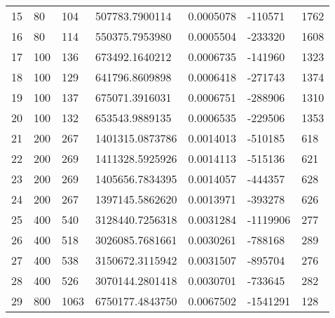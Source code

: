 \begin{longtable}{lllllll}
    15               & 80             & 104            & 507783.7900114     & 0.0005078        & -110571         & 1762                 \\
    16               & 80             & 114            & 550375.7953980     & 0.0005504        & -233320         & 1608                 \\
    17               & 100            & 136            & 673492.1640212     & 0.0006735        & -141960         & 1323                 \\
    18               & 100            & 129            & 641796.8609898     & 0.0006418        & -271743         & 1374                 \\
    19               & 100            & 137            & 675071.3916031     & 0.0006751        & -288906         & 1310                 \\
    20               & 100            & 132            & 653543.9889135     & 0.0006535        & -229506         & 1353                 \\
    21               & 200            & 267            & 1401315.0873786    & 0.0014013        & -510185         & 618                  \\
    22               & 200            & 269            & 1411328.5925926    & 0.0014113        & -515136         & 621                  \\
    23               & 200            & 269            & 1405656.7834395    & 0.0014057        & -444357         & 628                  \\
    24               & 200            & 267            & 1397145.5862620    & 0.0013971        & -393278         & 626                  \\
    25               & 400            & 540            & 3128440.7256318    & 0.0031284        & -1119906        & 277                  \\
    26               & 400            & 518            & 3026085.7681661    & 0.0030261        & -788168         & 289                  \\
    27               & 400            & 538            & 3150672.3115942    & 0.0031507        & -895704         & 276                  \\
    28               & 400            & 526            & 3070144.2801418    & 0.0030701        & -733645         & 282                  \\
    29               & 800            & 1063           & 6750177.4843750    & 0.0067502        & -1541291        & 128                  \\

\end{longtable}
